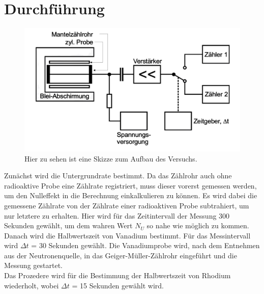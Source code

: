 \section{Durchführung}
\label{durchfuehrung}

\begin{figure}
    \centering
    \includegraphics[scale = 0.35]{content/Aufbau2.pdf}
    \caption{Hier zu sehen ist eine Skizze zum Aufbau des Versuchs.}
    \label{fig:aufbau}
\end{figure}

Zunächst wird die Untergrundrate bestimmt. Da das Zählrohr auch ohne radioaktive Probe eine Zählrate registriert, muss dieser vorerst gemessen werden, um den Nulleffekt in die Berechnung einkalkulieren zu können. Es wird dabei die gemessene Zählrate von der Zählrate einer radioaktiven Probe subtrahiert, um nur letztere zu erhalten. Hier wird für das Zeitintervall der Messung 300 Sekunden gewählt, um dem wahren Wert \(N_U\) so nahe wie möglich zu kommen.\\
Danach wird die Halbwertszeit von Vanadium bestimmt. Für das Messintervall wird \(\Delta t\) = 30 Sekunden gewählt. Die Vanadiumprobe wird, nach dem Entnehmen aus der Neutronenquelle, in das Geiger-Müller-Zählrohr eingeführt und die Messung gestartet.\\
Das Prozedere wird für die Bestimmung der Halbwertszeit von Rhodium wiederholt, wobei \(\Delta t\) = 15 Sekunden gewählt wird.